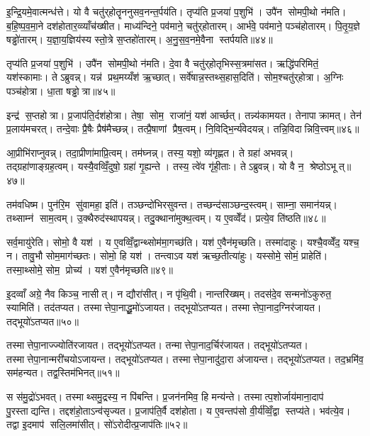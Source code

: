 इ॒न्द्रि॒यमे॒वात्मन्ध॑त्ते। यो वै चतु॑र्‌होतॄननुसव॒नन्त॒र्पय॑ति। तृप्य॑ति प्र॒जया॑ प॒शुभि॑। उपै॑न सोमपी॒थो न॑मति। ब॒हि॒ष्प॒व॒मा॒ने दश॑होतार॒व्व्याँच॑ख्षीत। माध्य॑न्दिने॒ पव॑माने॒ चतु॑र्‌होतारम्। आर्भ॑वे॒ पव॑माने॒ पञ्च॑होतारम्। पि॒तृ॒य॒ज्ञे षड्ढो॑तारम्। य॒ज्ञा॒य॒ज्ञिय॑स्य स्तो॒त्रे स॒प्तहो॑तारम्। अ॒नु॒स॒व॒नमे॒वैना स्तर्पयति॥४४॥

तृप्य॑ति प्र॒जया॑ प॒शुभि॑। उपै॑न सोमपी॒थो न॑मति। दे॒वा वै चतु॑र्‌होतृभिस्स॒त्रमा॑सत। ऋद्धि॑परिमितं॒ यश॑स्कामाः। तेऽब्रुवन्न्। यन्न॑ प्रथ॒मय्यँश॑ ऋ॒च्छात्। सर्वे॑षान्न॒स्तथ्स॒हास॒दिति॑। सोम॒श्चतु॑र्‌होत्रा। अ॒ग्निः पञ्च॑होत्रा। धा॒ता षड्ढोत्रा॥४५॥

इन्द्र॑ स॒प्तहोत्रा। प्र॒जाप॑ति॒र्दश॑होत्रा। तेषा॒ सोम॒ राजा॑नं॒ यश॑ आर्च्छत्। तन्न्य॑कामयत। तेनापाक्रामत्। तेन॑ प्र॒लाय॑मचरत्। तन्दे॒वाः प्रै॒षैः प्रैष॑मैच्छन्न्। तत्प्रै॒षाणां प्रैष॒त्वम्। नि॒विद्भि॒र्न्य॑वेदयन्न्। तन्नि॒विदान्निवि॒त्त्वम्॥४६॥

आ॒प्रीभि॑राप्नुवन्न्। तदा॒प्रीणा॑माप्रि॒त्वम्। तम॑घ्नन्न्। तस्य॒ यशो॒ व्य॑गृह्णत। ते ग्रहा॑ अभवन्न्। तद्ग्रहा॑णाङ्ग्रह॒त्वम्। यस्यै॒वव्विँ॒दुषो॒ ग्रहा॑ गृ॒ह्यन्ते। तस्य॒ त्वे॑व गृ॑ही॒ताः। तेऽब्रुवन्न्। यो वै न॒ श्रेष्ठोऽभूत्॥४७॥

तम॑वधिष्म। पुन॑रि॒म सु॑वामहा॒ इति॑। तञ्छन्दो॑भिरसुवन्त। तच्छन्द॑साञ्छन्द॒स्त्वम्। साम्ना॒ समान॑यन्न्। तथ्साम्न॑ साम॒त्वम्। उ॒क्थैरुद॑स्थापयन्न्। तदु॒क्थाना॑मुक्थ॒त्वम्। य ए॒वव्वेँद॑। प्रत्ये॒व ति॑ष्ठति॥४८॥

सर्व॒मायु॑रेति। सोमो॒ वै यश॑। य ए॒वव्विँ॒द्वान्थ्सोम॑मा॒गच्छ॑ति। यश॑ ए॒वैन॑मृच्छति। तस्मा॑दाहुः। यश्चै॒वव्वेँद॒ यश्च॒ न। तावु॒भौ सोम॒माग॑च्छतः। सोमो॒ हि यश॑। तन्त्वाऽव यश॑ ऋच्छ॒तीत्या॑हुः। यस्सोमे॒ सोमं॒ प्राहेति॑। तस्मा॒थ्सोमे॒ सोम॒ प्रोच्य॑। यश॑ ए॒वैन॑मृच्छति॥४९॥

इ॒दव्वाँ अग्रे॒ नैव किञ्च॒ नासीत्। न द्यौरा॑सीत्। न पृ॑थि॒वी। नान्तरि॑ख्षम्। तदस॑दे॒व सन्मनो॑ऽकुरुत॒ स्यामिति॑। तद॑तप्यत। तस्मात्तेपा॒नाद्धू॒मो॑ऽजायत। तद्भूयो॑ऽतप्यत। तस्मात्तेपा॒नाद॒ग्निर॑जायत। तद्भूयो॑ऽतप्यत॥५०॥

तस्मात्तेपा॒नाज्ज्योति॑रजायत। तद्भूयो॑ऽतप्यत। तन्मात्तेपा॒नाद॒र्चिर॑जायत। तद्भूयो॑ऽतप्यत। तस्मात्तेपा॒नान्मरी॑चयोऽजायन्त। तद्भूयो॑ऽतप्यत। तस्मात्तेपा॒नादु॑दा॒रा अ॑जायन्त। तद्भूयो॑ऽतप्यत। तद॒भ्रमि॑व॒ सम॑हन्यत। तद्व॒स्तिम॑भिनत्॥५१॥

स स॑मु॒द्रो॑ऽभवत्। तस्माथ्समु॒द्रस्य॒ न पि॑बन्ति। प्र॒जन॑नमिव॒ हि मन्य॑न्ते। तस्मात्प॒शोर्जाय॑माना॒दाप॑ पु॒रस्ताद्यन्ति। तद्दश॑हो॒ताऽन्व॑सृज्यत। प्र॒जाप॑ति॒र्वै दश॑होता। य ए॒वन्तप॑सो वी॒र्य॑व्विँ॒द्वा स्तप्य॑ते। भव॑त्ये॒व। तद्वा इ॒दमाप॑ सलि॒लमा॑सीत्। सो॑ऽरोदीत्प्र॒जाप॑तिः॥५२॥

